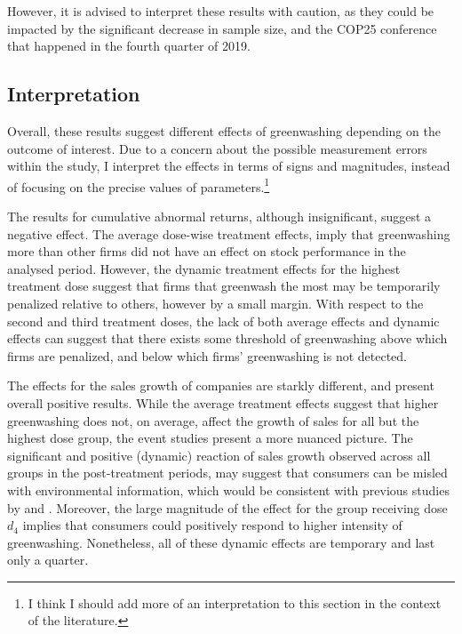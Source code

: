 \documentclass[12pt]{article}
\begin{document}
However, it is advised to interpret these results with caution, as they could be impacted by the significant decrease in sample size, and the COP25 conference that happened in the fourth quarter of 2019. 



\subsection{Interpretation}

Overall, these results suggest different effects of greenwashing depending on the outcome of interest. Due to a concern about the possible measurement errors within the study, I interpret the effects in terms of signs and magnitudes, instead of focusing on the precise values of parameters.\footnote{I think I should add more of an interpretation to this section in the context of the literature.}

The results for cumulative abnormal returns, although insignificant, suggest a negative effect. The average dose-wise treatment effects, imply that greenwashing more than other firms did not have an effect on stock performance in the analysed period. However, the dynamic treatment effects for the highest treatment dose suggest that firms that greenwash the most may be temporarily penalized relative to others, however by a small margin. With respect to the second and third treatment doses, the lack of both average effects and dynamic effects can suggest that there exists some threshold of greenwashing above which firms are penalized, and below which firms' greenwashing is not detected.

The effects for the sales growth of companies are starkly different, and present overall positive results. While the average treatment effects suggest that higher greenwashing does not, on average, affect the growth of sales for all but the highest dose group, the event studies present a more nuanced picture. The significant and positive (dynamic) reaction of sales growth observed across all groups in the post-treatment periods, may suggest that consumers can be misled with environmental information, which would be consistent with previous studies by \citeauthor{schmuckMisleadingConsumersGreen2018} and \citeauthor{parguelCanEvokingNature2015}. Moreover, the large magnitude of the effect for the group receiving dose $d_4$ implies that consumers could positively respond to higher intensity of greenwashing. Nonetheless, all of these dynamic effects are temporary and last only a quarter.
\end{document}

